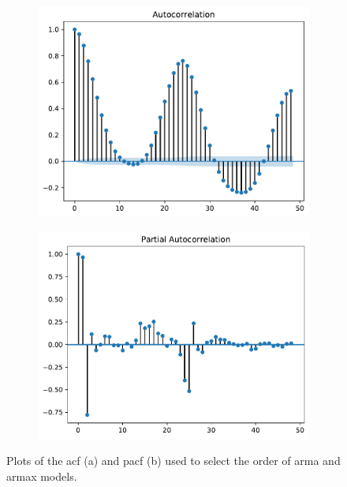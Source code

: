 \begin{figure}[h!]%
	\centering
	\begin{subfigure}{.5\textwidth}
		\centering
		\includegraphics[width=\textwidth]{plots/ACF/load_48lags_ndiff0_hstep1}%
		\caption{}
		\label{fig:acf_load_lags48}%
	\end{subfigure}%
	\begin{subfigure}{.5\textwidth}
		\centering
		\includegraphics[width=\textwidth]{plots/PACF/load_48lags_ndiff0_hstep1}%
		\caption{}
		\label{fig:pacf_load_lags48}%
	\end{subfigure}
	\caption{Plots of the \acrshort{acf} (a) and \acrshort{pacf} (b) used to select the order of \acrshort{arma} and \acrshort{armax} models.}
	\label{fig:acf_compare}
\end{figure}

